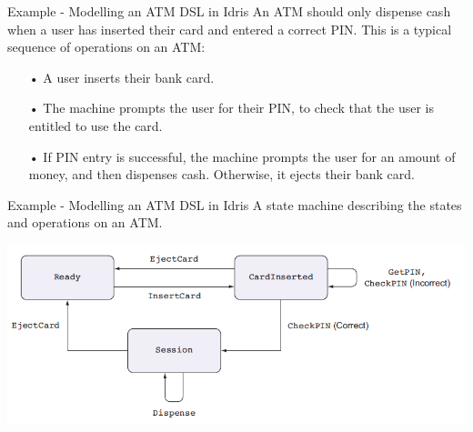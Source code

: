 \documentclass{beamer}
\newcommand{\dsltitle}{Example - Modelling an ATM DSL in Idris}
\begin{document}

\begin{frame}[fragile]{\dsltitle}
An ATM should only dispense cash when a user has inserted their
card and entered a correct PIN. This is a typical sequence of operations on an ATM:
\begin{enumerate}
\item[•] A user inserts their bank card.
\item[•] The machine prompts the user for their PIN, to check that the user is entitled to
use the card.
\item[•] If PIN entry is successful, the machine prompts the user for an amount of
money, and then dispenses cash. Otherwise, it ejects their bank card.
\end{enumerate}
\end{frame}

\begin{frame}[fragile]{\dsltitle}
A state machine describing the states and operations on an ATM.\\
\begin{center}
	\includegraphics[scale=0.5]{pics/atm-model}
\end{center}
\end{frame}
\end{document}
